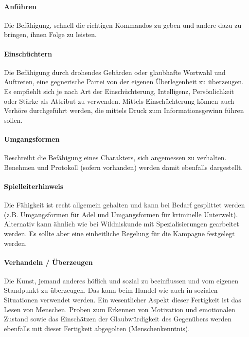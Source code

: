 \documentclass{article}
\begin{document}
\paragraph{Anführen}

Die Befähigung, schnell die richtigen Kommandos zu geben und andere dazu zu bringen, ihnen Folge zu leisten.

\paragraph{Einschüchtern}

Die Befähigung durch drohendes Gebärden oder glaubhafte Wortwahl und Auftreten, eine gegnerische Partei von der
eigenen Überlegenheit zu überzeugen. Es empfiehlt sich je nach Art der Einschüchterung, Intelligenz, Persönlichkeit
oder Stärke als Attribut zu verwenden. Mittels Einschüchterung können auch Verhöre durchgeführt werden, die mittels
Druck zum Informationsgewinn führen sollen.

\paragraph{Umgangsformen}

Beschreibt die Befähigung eines Charakters, sich angemessen zu verhalten. Benehmen und Protokoll (sofern vorhanden)
werden damit ebenfalls dargestellt.

\begin{mdframed}[hidealllines=true, backgroundcolor=black!10]
\paragraph{Spielleiterhinweis}

Die Fähigkeit ist recht allgemein gehalten und kann bei Bedarf gesplittet werden (z.B. Umgangsformen für Adel und
Umgangsformen für kriminelle Unterwelt). Alternativ kann ähnlich wie bei Wildniskunde mit Spezialisierungen gearbeitet
werden. Es sollte aber eine einheitliche Regelung für die Kampagne festgelegt werden.

\end{mdframed}
\paragraph{Verhandeln / Überzeugen}

Die Kunst, jemand anderes höflich und sozial zu beeinflussen und vom eigenen Standpunkt zu überzeugen. Das kann beim
Handel wie auch in sozialen Situationen verwendet werden. Ein wesentlicher Aspekt dieser Fertigkeit ist das Lesen von
Menschen. Proben zum Erkennen von Motivation und emotionalen Zustand sowie das Einschätzen der Glaubwürdigkeit des
Gegenübers werden ebenfalls mit dieser Fertigkeit abgegolten (Menschenkenntnis).
\end{document}
